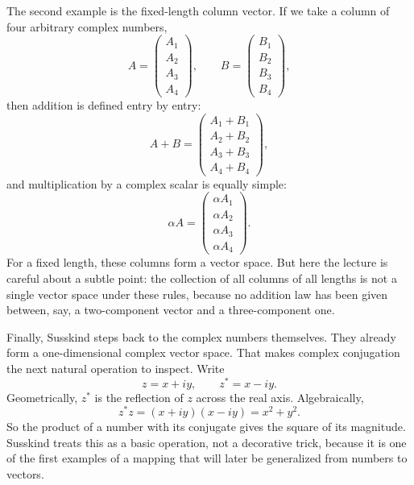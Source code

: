 The second example is the fixed-length column vector. If we take a column of four arbitrary complex numbers,
\begin{equation}
A=
\begin{pmatrix}
A_1\\
A_2\\
A_3\\
A_4
\end{pmatrix},
\qquad
B=
\begin{pmatrix}
B_1\\
B_2\\
B_3\\
B_4
\end{pmatrix},
\end{equation}
then addition is defined entry by entry:
\begin{equation}
A+B=
\begin{pmatrix}
A_1+B_1\\
A_2+B_2\\
A_3+B_3\\
A_4+B_4
\end{pmatrix},
\end{equation}
and multiplication by a complex scalar is equally simple:
\begin{equation}
\alpha A=
\begin{pmatrix}
\alpha A_1\\
\alpha A_2\\
\alpha A_3\\
\alpha A_4
\end{pmatrix}.
\end{equation}
For a fixed length, these columns form a vector space. But here the lecture is careful about a subtle point: the collection of all columns of all lengths is not a single vector space under these rules, because no addition law has been given between, say, a two-component vector and a three-component one.

Finally, Susskind steps back to the complex numbers themselves. They already form a one-dimensional complex vector space. That makes complex conjugation the next natural operation to inspect. Write
\begin{equation}
z=x+iy,
\qquad
z^\ast=x-iy.
\end{equation}
Geometrically, \(z^\ast\) is the reflection of \(z\) across the real axis. Algebraically,
\begin{equation}
z^\ast z=(x+iy)(x-iy)=x^2+y^2.
\end{equation}
So the product of a number with its conjugate gives the square of its magnitude. Susskind treats this as a basic operation, not a decorative trick, because it is one of the first examples of a mapping that will later be generalized from numbers to vectors.

